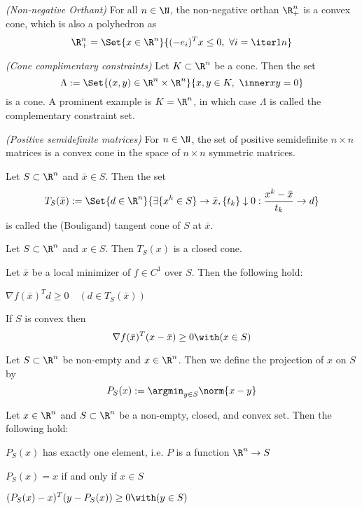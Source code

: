 \begin{enumerata}
  \item \textit{(Non-negative Orthant)} For all $n\in\N$, the
  non-negative orthan $\R^n_+$ is a convex cone, which is also a polyhedron as
  $$
    \R^n_+=\Set{x\in\R^n}{(-e_i)^Tx\leq 0,\ \forall i=\iter1n}
  $$
  \item \textit{(Cone complimentary constraints)} Let $K\subset \R^n$ be
  a cone. Then the set
  $$
    \Lambda:=\Set{(x,y)\in\R^n\times\R^n}{x,y\in K,\ \inner xy=0}
  $$
  is a cone. A prominent example is $K=\R^n$, in which case $\Lambda$
  is called the complementary constraint set.
  \item \textit{(Positive semidefinite matrices)} For $n\in\N$, the set
  of positive semidefinite $n\times n$ matrices is a convex cone in
  the space of $n\times n$ symmetric matrices.
\end{enumerata}

\label{add7a4b}

Let $S\subset\R^n$ and $\bar x\in S$. Then the set
$$
  T_S(\bar x):=\Set{d\in\R^n}
  {\exists\{x^k\in S\}\to\bar x,\{t_k\}\downarrow0:\frac{x^k-\bar x}{t_k}\to d}
$$
is called the (Bouligand) tangent cone of $S$ at $\bar x$.

\label{fe814cc}

Let $S\subset\R^n$ and $x\in S$. Then $T_S(x)$ is a closed cone.

\label{c8e5836}

Let $\bar x$ be a local minimizer of $f\in C^1$ over $S$. Then the following
hold:
\begin{enumerata}
  \item $\nabla f(\bar x)^Td\geq0\quad(d\in T_S(\bar x))$
  \item If $S$ is convex then
  $$
    \nabla f(\bar x)^T(x-\bar x)\geq 0\with(x\in S)
  $$
\end{enumerata}

\label{fb41457}

Let $S\subset\R^n$ be non-empty and $x\in\R^n$. Then we define the projection
of $x$ on $S$ by
$$
  P_S(x):=\argmin_{y\in S}\norm{x-y}
$$

\label{ce30ae7}

Let $x\in\R^n$ and $S\subset\R^n$ be a non-empty, closed, and convex set. Then
the following hold:
\begin{enumerata}
  \item $P_S(x)$ has exactly one element, i.e. $P$ is a function
  $\R^n\to S$
  \item $P_S(x)=x$ if and only if $x\in S$
  \item $(P_S(x)-x)^T(y-P_S(x))\geq0\with(y\in S)$
\end{enumerata}

